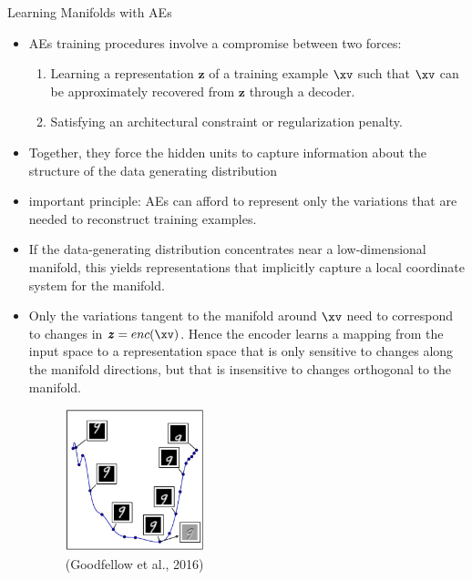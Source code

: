 \begin{vbframe}{Learning Manifolds with AEs}
  
    \begin{itemize}
        \item AEs training procedures involve a compromise between two forces:

            \begin{enumerate}
                \item Learning a representation $\pmb{z}$ of a training example $\xv$ such that $\xv$ can be approximately recovered from $\pmb{z}$ through a decoder.

                \item Satisfying an architectural constraint or regularization penalty.
            \end{enumerate}
   
       \item Together, they force the hidden units to capture information about the structure of the data generating distribution 
       
       \item important principle: AEs can afford to 
       represent only the variations that are needed to reconstruct training examples.
       
         \item If the data-generating distribution concentrates near a low-dimensional manifold, this yields representations that implicitly capture a local coordinate system for the manifold. 
         
         \framebreak
       
   \item Only the variations tangent to the manifold around $\xv$ need to correspond to changes in $\pmb{z}=enc(\xv)$. Hence the encoder learns a mapping from the input space to a representation space that is only sensitive to changes along the manifold directions, but that is insensitive to changes orthogonal to the manifold.  
       
       \begin{figure}
    \centering
    \includegraphics[width=4cm]{plots/AE-manifold.jpg}
    \caption{(Goodfellow et al., 2016)}
    \end{figure}
    

\end{itemize}
\end{vbframe}

